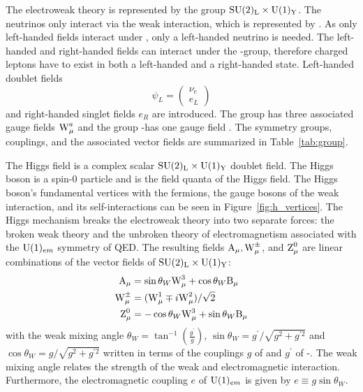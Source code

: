 The electroweak theory is represented by the group $\text{SU}(2)_{\text{L}} \times \text{U}(1)_{\text{Y}}$. The neutrinos only interact via the weak interaction, which is represented by \iso. As only left-handed fields interact under \iso, only a left-handed neutrino is needed. The left-handed and right-handed fields can interact under the \hyp group, therefore charged leptons have to exist in both a left-handed and a right-handed state. Left-handed doublet fields
%
\begin{equation}
  \psi_{L}=\left(\begin{array}{l}
  \nu_{e} \\
  e_{L}
  \end{array}\right)
\end{equation}
%
and right-handed singlet fields $e_{R}$ are introduced. The group \iso has three associated gauge fields $\text{W}_{\mu}^{a}$ and the group \hyp has one gauge field \bmu. The symmetry groups, couplings, and the associated vector fields are summarized in Table~\ref{tab:group}.

The Higgs field is a complex scalar $\text{SU}(2)_{\text{L}} \times \text{U}(1)_{\text{Y}}$ doublet field. The Higgs boson is a spin-0 particle and is the field quanta of the Higgs field. The Higgs boson's fundamental vertices with the fermions, the gauge bosons of the weak interaction, and its self-interactions can be seen in Figure~\ref{fig:h_vertices}. The Higgs mechanism breaks the electroweak theory into two separate forces: the broken weak theory and the unbroken theory of electromagnetism associated with the $\text{U}(1)_{em}$ symmetry of QED. The resulting fields $\text{A}_{\mu}, \text{W}_{\mu}^{\pm}$, and $\text{Z}_{\mu}^{0}$ are linear combinations of the vector fields of $\text{SU}(2)_{\text{L}} \times \text{U}(1)_{\text{Y}}$:
%
\begin{equation}
  \begin{aligned}
    \text{A}_{\mu}&=\sin \theta_{W} \text{W}_{\mu}^{3}+\cos \theta_{W} \text{B}_{\mu} \\
    \text{W}_{\mu}^{\pm}&=(\text{W}_{\mu}^{1} \mp i \text{W}_{\mu}^2) / \sqrt{2} \\
    \text{Z}_{\mu}^{0}&=-\cos \theta_{W} \text{W}_{\mu}^{3}+\sin \theta_{W} \text{B}_{\mu}
  \end{aligned}
\end{equation}
%
with the weak mixing angle $\theta_{W}=\tan ^{-1}(\frac{g^{\prime}}{g})$, $\sin \theta_{W}=g^{\prime} / \sqrt{g^2+g^{\prime 2}}$ and $\cos \theta_{W}=g / \sqrt{g^2+g^{\prime 2}}$ written in terms of the couplings $g$ of \iso and  $g^{\prime}$ of \hyp. The weak mixing angle relates the strength of the weak and electromagnetic interaction. Furthermore, the electromagnetic coupling $e$ of $\text{U}(1)_{em}$ is given by $e \equiv g \sin \theta_{W}$.

